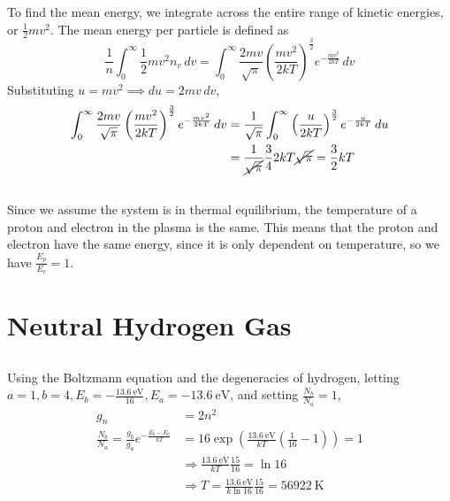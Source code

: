 \documentclass{article}
\begin{document}
To find the mean energy, we integrate across the entire range of kinetic energies, or \(\frac{1}{2} m v^2\).
The mean energy per particle is defined as
\begin{equation}
    \frac{1}{n} \int_0^\infty \frac{1}{2} m v^2 n_v \, dv = \int_0^\infty \frac{2 m v}{\sqrt{\pi}} \left(\frac{m v^2}{2 kT}\right)^{\frac{3}{2}} e^{-\frac{m v^2}{2 kT}} \, dv
\end{equation}
Substituting \(u = m v^2 \implies du = 2 m v \, dv\),
\begin{align}
    \int_0^\infty \frac{2 m v}{\sqrt{\pi}} \left(\frac{m v^2}{2 kT}\right)^{\frac{3}{2}} e^{-\frac{m v^2}{2 kT}} \, dv &= \frac{1}{\sqrt{\pi}} \int_0^\infty \left(\frac{u}{2 kT}\right)^{\frac{3}{2}} e^{-\frac{u}{2 kT}} \, du \\
    &= \frac{1}{\cancel{\sqrt{\pi}}} \frac{3}{4} 2 kT \cancel{\sqrt{\pi}} = \frac{3}{2} kT
\end{align}

\subsection{}

Since we assume the system is in thermal equilibrium, the temperature of a proton and electron in the plasma is the same.
This means that the proton and electron have the same energy, since it is only dependent on temperature, so we have \(\frac{E_p}{E_e} = 1\).

\section{Neutral Hydrogen Gas}

\subsection{}

Using the Boltzmann equation and the degeneracies of hydrogen, letting \(a = 1, b = 4, E_b = -\frac{\SI{13.6}{\electronvolt}}{16}, E_a = \SI{-13.6}{\electronvolt}\), and setting \(\frac{N_b}{N_a} = 1\),
\begin{align}
    g_n &= 2n^2 \\
    \frac{N_b}{N_a} = \frac{g_b}{g_a} e^{-\frac{E_b - E_a}{kT}} &= 16 \exp\left(\frac{\SI{13.6}{\electronvolt}}{kT} \left(\frac{1}{16} - 1\right)\right) = 1 \\
    &\Rightarrow \frac{\SI{13.6}{\electronvolt}}{kT} \frac{15}{16} = \ln{16} \\
    &\Rightarrow T = \frac{\SI{13.6}{\electronvolt}}{k \ln{16}} \frac{15}{16} = \SI{56922}{\kelvin}
\end{align}
\end{document}
